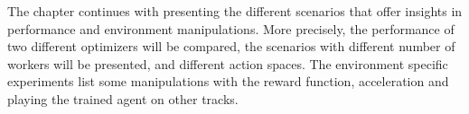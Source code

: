 The chapter continues with presenting the different scenarios that offer insights in performance and environment manipulations. More precisely, the performance of two different optimizers will be compared, the scenarios with different number of workers will be presented, and different action spaces. The environment specific experiments list some manipulations with the reward function, acceleration and playing the trained agent on other tracks.






